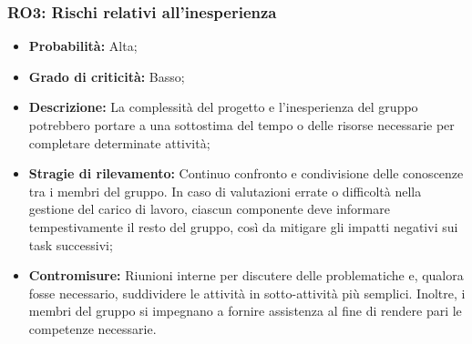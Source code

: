 \subsubsection{RO3: Rischi relativi all'inesperienza}
\begin{itemize}
    \item \textbf{Probabilità:} Alta;
    \item \textbf{Grado di criticità:} Basso;
    \item \textbf{Descrizione:} La complessità del progetto e l’inesperienza del gruppo potrebbero portare a una sottostima del tempo o delle risorse necessarie per completare determinate attività;
    \item \textbf{Stragie di rilevamento:} Continuo confronto e condivisione delle conoscenze tra i membri del gruppo. In caso di valutazioni errate o difficoltà nella gestione del carico di lavoro, ciascun componente deve informare tempestivamente il resto del gruppo, così da mitigare gli impatti negativi sui task successivi;
    \item \textbf{Contromisure:} Riunioni interne per discutere delle problematiche e, qualora fosse necessario, suddividere le attività in sotto-attività più semplici. Inoltre, i membri del gruppo si impegnano a fornire assistenza al fine di rendere pari le competenze necessarie.
\end{itemize}
